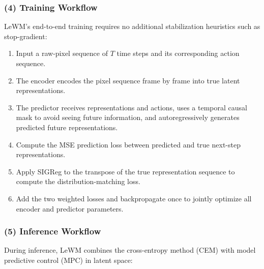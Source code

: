\hypertarget{training-workflow-1}{%
\subsubsection{(4) Training Workflow}\label{training-workflow-1}}

LeWM's end-to-end training requires no additional stabilization heuristics such as stop-gradient:

\begin{enumerate}
\def\labelenumi{\arabic{enumi}.}
\tightlist
\item
  Input a raw-pixel sequence of \(T\) time steps and its corresponding action sequence.
\item
  The encoder encodes the pixel sequence frame by frame into true latent representations.
\item
  The predictor receives representations and actions, uses a temporal causal mask to avoid seeing future information, and autoregressively generates predicted future representations.
\item
  Compute the MSE prediction loss between predicted and true next-step representations.
\item
  Apply SIGReg to the transpose of the true representation sequence to compute the distribution-matching loss.
\item
  Add the two weighted losses and backpropagate once to jointly optimize all encoder and predictor parameters.
\end{enumerate}

\hypertarget{inference-workflow-1}{%
\subsubsection{(5) Inference Workflow}\label{inference-workflow-1}}

During inference, LeWM combines the cross-entropy method (CEM) with model predictive control (MPC) in latent space:

